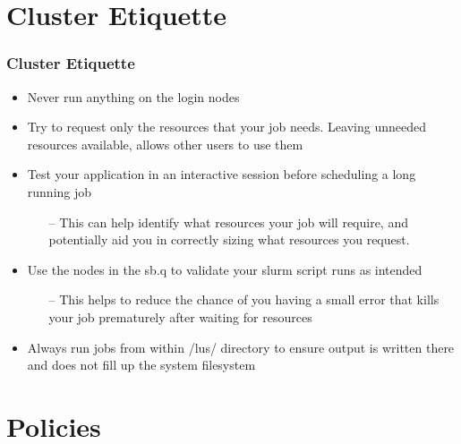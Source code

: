 \documentclass[t,hyperref={pdfpagelabels=false}]{beamer}
\newcommand{\ctilde}{{\fontfamily{ptm}\selectfont\texttildelow}}
\begin{document}
\section{Cluster Etiquette}
\begin{frame}
\frametitle{Cluster Etiquette}
\begin{itemize}
\item Never run anything on the login nodes
\item Try to request only the resources that your job needs.  Leaving unneeded resources available, allows other users to use them
\item Test your application in an interactive session before scheduling a long running job
\begin{itemize}
\item[--] This can help identify what resources your job will require, and potentially aid you in correctly sizing what resources you request.
\end{itemize}
\item Use the nodes in the sb.q to validate your slurm script runs as intended
\begin{itemize}
\item[--] This helps to reduce the chance of you having a small error that kills your job prematurely after waiting for resources 
\end{itemize} 
\item Always run jobs from within {\ctilde}/lus/ directory to ensure output is written there and does not fill up the system filesystem
\end{itemize}
\end{frame}



\section{Policies}
\end{document}
